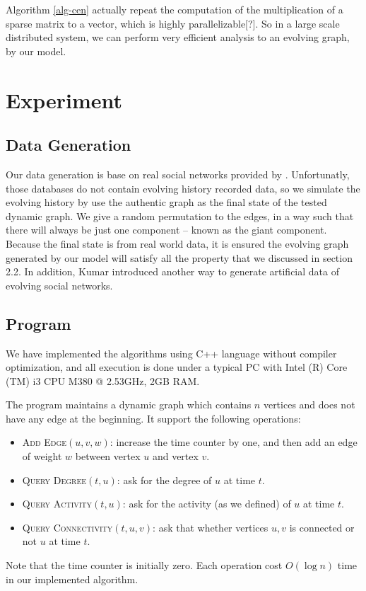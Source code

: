 \documentclass[12pt,abstract=true]{scrartcl}
\numberwithin{equation}{section}
\theoremstyle{definition}   \newtheorem{definition}{Definition}[section]
\theoremstyle{plain}        \newtheorem{theorem}{Theorem}[section]
\theoremstyle{plain}        \newtheorem{observation}{Observation}[section]
\theoremstyle{plain}        \newtheorem{fact}{Fact}[section]
\theoremstyle{plain}        \newtheorem{claim}{Claim}[section]
\theoremstyle{plain}        \newtheorem{lemma}[theorem]{Lemma}
\theoremstyle{plain}        \newtheorem{corollary}[theorem]{Corollary}
\theoremstyle{remark}       \newtheorem{example}{Example}[section]
\theoremstyle{remark}       \newtheorem{remark}{Remark}[section]
\begin{document}
Algorithm \ref{alg-cen} actually repeat the computation of the multiplication
of a sparse matrix to a vector, which is highly parallelizable[?]. So in a large
scale distributed system, we can perform very efficient analysis to an evolving
graph, by our model.
\section{Experiment}
\subsection{Data Generation} 
Our data generation is base on real social networks provided by \cite{database1,
database2}. Unfortunatly, those databases do not contain evolving history
recorded data, so we simulate the evolving history by use the
authentic graph as the final state of the tested dynamic graph.
We give a random permutation to the edges, in a way such that there will always
be just one component -- known as the giant component. Because the final state
is from real world data, it is ensured 
the evolving graph generated by our model will satisfy all the property that we
discussed in section 2.2. In addition, Kumar introduced another way to generate
artificial data of evolving social networks\cite{kumar2010structure}.

\subsection{Program}
We have implemented the algorithms using C++ language without compiler
optimization, and all execution is done under a typical PC with 
Intel (R) Core (TM) i3 CPU M380  @ 2.53GHz, 2GB RAM.
	
The program maintains a dynamic graph which contains $n$ vertices and does not
have any edge at the beginning.
It support the following operations:
\begin{itemize}
	\item \textsc{Add Edge$(u,v,w)$:} increase the time counter by one, and then add an edge
		of weight $w$ between vertex $u$ and vertex $v$.
	\item \textsc{Query Degree$(t,u)$:} ask for the degree of $u$ at time $t$.
	\item \textsc{Query Activity$(t,u)$:} ask for the activity (as we defined) of $u$ at time $t$.
	\item \textsc{Query Connectivity$(t,u,v)$:} ask that whether vertices $u,v$ is connected or not
		$u$ at time $t$.
\end{itemize}
Note that the time counter is initially zero.
Each operation cost $O(\log n)$ time in our implemented algorithm.
\end{document}
